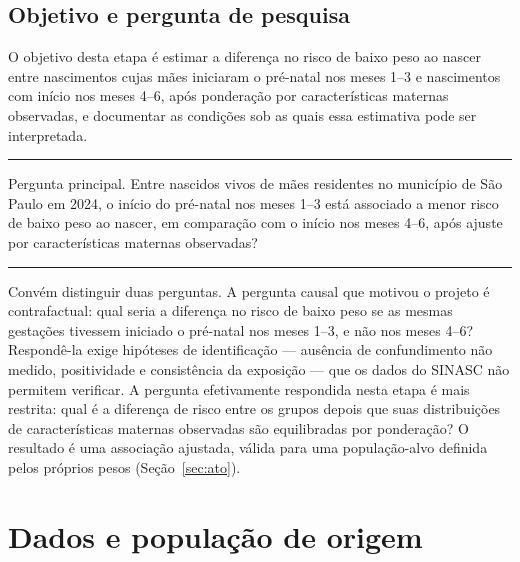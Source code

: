 \documentclass[11pt,a4paper]{article}
\begin{document}
\subsection{Objetivo e pergunta de pesquisa}

O objetivo desta etapa é estimar a diferença no risco de baixo peso ao nascer entre
nascimentos cujas mães iniciaram o pré-natal nos meses 1--3 e nascimentos com início nos
meses 4--6, após ponderação por características maternas observadas, e documentar as
condições sob as quais essa estimativa pode ser interpretada.

\begin{center}
\begin{minipage}{0.9\linewidth}
{\color{iptciano}\rule{\linewidth}{0.6pt}}\par\vspace{2pt}
\textsf{\color{iptazul}Pergunta principal.} Entre nascidos vivos de mães residentes no
município de São Paulo em 2024, o início do pré-natal nos meses 1--3 está associado a
menor risco de baixo peso ao nascer, em comparação com o início nos meses 4--6, após
ajuste por características maternas observadas?\par\vspace{2pt}
{\color{iptciano}\rule{\linewidth}{0.6pt}}
\end{minipage}
\end{center}

Convém distinguir duas perguntas. A pergunta causal que motivou o projeto é
contrafactual: qual seria a diferença no risco de baixo peso se as mesmas gestações
tivessem iniciado o pré-natal nos meses 1--3, e não nos meses 4--6? Respondê-la exige
hipóteses de identificação --- ausência de confundimento não medido, positividade e
consistência da exposição \cite{hernan2025} --- que os dados do SINASC não permitem
verificar. A pergunta efetivamente respondida nesta etapa é mais restrita: qual é a
diferença de risco entre os grupos depois que suas distribuições de características
maternas observadas são equilibradas por ponderação? O resultado é uma associação
ajustada, válida para uma população-alvo definida pelos próprios pesos
(Seção~\ref{sec:ato}).

\section{Dados e população de origem}\label{sec:dados}
\end{document}
